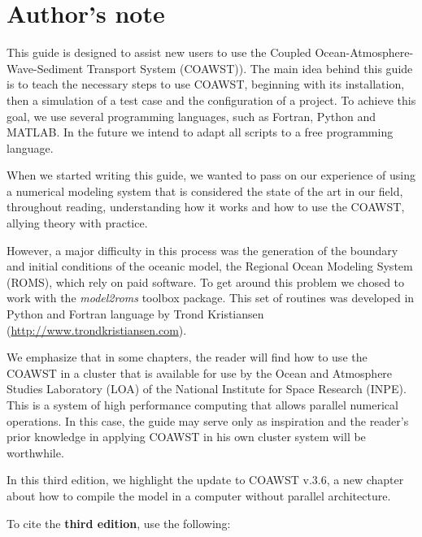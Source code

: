 \chapter*{Author's note}
\bigskip
\noindent This guide is designed to assist new users to use the Coupled Ocean-Atmosphere-Wave-Sediment Transport System (COAWST)). The main idea behind this 
guide is to teach the necessary steps to use COAWST, beginning with its installation, then a simulation of a test case and the configuration of a
project. To achieve this goal, we use several programming languages, such as Fortran, Python and MATLAB. In the future we intend to adapt all scripts
to a free programming language.
\bigskip

\noindent When we started writing this guide, we wanted to pass on our experience of using a numerical modeling system that is considered the state of the art in our field, 
throughout reading, understanding how it works and how to use the COAWST, allying theory with practice.
\bigskip

\noindent However, a major difficulty in this process was the generation of the boundary and initial conditions of the oceanic model, the Regional Ocean Modeling System (ROMS),
which rely on paid software. To get around this problem we chosed to work with the \textit {model2roms} toolbox package. This set of routines was developed in Python and 
Fortran language by Trond Kristiansen (\textcolor{bleu_cite} {\href{http://www.trondkristiansen.com}{http://www.trondkristiansen.com}}).
\bigskip

\noindent We emphasize that in some chapters, the reader will find how to use the COAWST in a cluster that is available for use by the Ocean and Atmosphere 
Studies Laboratory (LOA) of the National Institute for Space Research (INPE). This is a system of high performance computing that allows parallel numerical operations. 
In this case, the guide may serve only as inspiration and the reader's prior knowledge in applying COAWST in his own cluster system will be worthwhile.
\bigskip

\noindent In this third edition, we highlight the update to COAWST v.3.6, a new chapter about how to compile the model in a computer without parallel architecture.
\bigskip

\noindent To cite the \textbf{third edition}, use the following:
\bigskip

\bigskip
\pagebreak 

